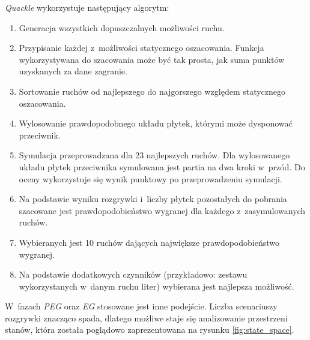 \documentclass[a4paper,twocolumn,12pt]{article}
\begin{document}
\emph{Quackle} wykorzystuje następujący algorytm:

\begin{enumerate}
 \item Generacja wszystkich dopuszczalnych możliwości ruchu.
 \item Przypisanie każdej z~możliwości statycznego oszacowania. Funkcja wykorzystywana do szacowania może być tak prosta, jak suma punktów uzyskanych za dane zagranie.
 \item Sortowanie ruchów od najlepszego do najgorszego względem statycznego oszacowania.
 \item Wylosowanie prawdopodobnego układu płytek, którymi może dysponować przeciwnik.
 \item Symulacja przeprowadzana dla 23 najlepszych ruchów. Dla wylosowanego układu płytek przeciwnika symulowana jest partia na dwa kroki w~przód. Do oceny wykorzystuje się wynik punktowy po przeprowadzeniu symulacji.
 \item Na podstawie wyniku rozgrywki i~liczby płytek pozostałych do pobrania szacowane jest prawdopodobieństwo wygranej dla każdego z~zasymulowanych ruchów.
 \item Wybieranych jest 10 ruchów dających największe prawdopodobieństwo wygranej.
 \item Na podstawie dodatkowych czynników (przykładowo: zestawu wykorzystanych w~danym ruchu liter) wybierana jest najlepsza możliwość.
\end{enumerate}

W~fazach \emph{PEG} oraz \emph{EG} stosowane jest inne podejście. Liczba scenariuszy rozgrywki znacząco spada, dlatego możliwe staje się analizowanie przestrzeni stanów, która została poglądowo zaprezentowana na rysunku \ref{fig:state_space}. 
\end{document}
